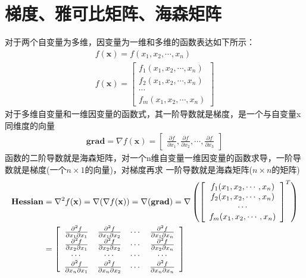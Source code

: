 \documentclass[10pt]{article}
\begin{document}
\section{梯度、雅可比矩阵、海森矩阵}
对于两个自变量为多维，因变量为一维和多维的函数表达如下所示：
\begin{align}  
    f(\mathbf{x})=f(x_1,x_2,\cdots,x_n) \\
    f(\mathbf{x})=\left[\begin{array}{c}f_1(x_1,x_2,\cdots,x_n) \\
        f_2(x_1,x_2,\cdots,x_n) \\ \cdots \\f_m(x_1,x_2,\cdots,x_n)
    \end{array}\right] 
\end{align}
对于多维自变量和一维因变量的函数式，其一阶导数就是梯度，是一个与自变量x同维度的向量
\begin{align} 
    \mathbf{grad}=\nabla f(\mathbf{x})=\left[\begin{array}{c}
    \frac{\partial f}{\partial x_1},\frac{\partial f}{\partial x_2},\cdots,
    \frac{\partial f}{\partial x_3}\end{array}\right] 
\end{align}
函数的二阶导数就是海森矩阵，对一个n维自变量一维因变量的函数求导，一阶导数就是梯度(一个$n\times1$的向量)，对梯度再求
一阶导数就是海森矩阵($n\times n$的矩阵)
\begin{align} 
    \mathbf{Hessian}&=\nabla^{2}f(\mathbf{x})=\nabla(\nabla f(\mathbf{x}))=\nabla(\mathbf{grad})=
    \nabla\left(\left[\begin{array}{c}f_1(x_1,x_2,\cdots,x_n) \\f_2(x_1,x_2,\cdots,x_n) \\ 
    \cdots \\f_m(x_1,x_2,\cdots,x_n)\end{array}\right]^{T}\right) \notag\\
    &=\left[\begin{array}{cccc}\frac{\partial^{2}f}{\partial x_1\partial x_1} & 
    \frac{\partial^{2}f}{\partial x_1\partial x_2} & \cdots & \frac{\partial^{2}f}{\partial x_1\partial x_n}\\
    \frac{\partial^{2}f}{\partial x_2\partial x_1} & 
    \frac{\partial^{2}f}{\partial x_2\partial x_2} & \cdots & \frac{\partial^{2}f}{\partial x_2\partial x_n}\\
    \cdots & \cdots & \cdots & \cdots \\
    \frac{\partial^{2}f}{\partial x_n\partial x_1} & 
    \frac{\partial^{2}f}{\partial x_n\partial x_2} & \cdots & \frac{\partial^{2}f}{\partial x_n\partial x_n}\\
    \end{array}\right]   
\end{align}
\end{document}
